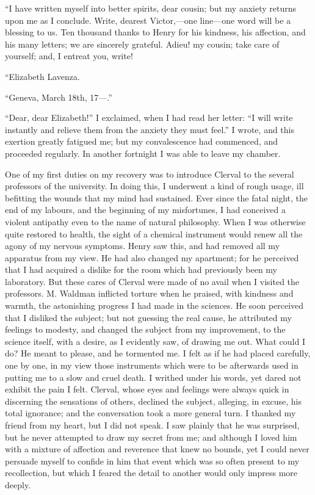 \documentclass[12pt,openright]{book}
\begin{document}
“I have written myself into better spirits, dear cousin; but my anxiety returns upon me as I conclude. Write, dearest Victor,—one line—one word will be a blessing to us. Ten thousand thanks to Henry for his kindness, his affection, and his many letters; we are sincerely grateful. Adieu! my cousin; take care of yourself; and, I entreat you, write!

“Elizabeth Lavenza.

“Geneva, March 18th, 17—.”

“Dear, dear Elizabeth!” I exclaimed, when I had read her letter: “I will write instantly and relieve them from the anxiety they must feel.” I wrote, and this exertion greatly fatigued me; but my convalescence had commenced, and proceeded regularly. In another fortnight I was able to leave my chamber.

One of my first duties on my recovery was to introduce Clerval to the several professors of the university. In doing this, I underwent a kind of rough usage, ill befitting the wounds that my mind had sustained. Ever since the fatal night, the end of my labours, and the beginning of my misfortunes, I had conceived a violent antipathy even to the name of natural philosophy. When I was otherwise quite restored to health, the sight of a chemical instrument would renew all the agony of my nervous symptoms. Henry saw this, and had removed all my apparatus from my view. He had also changed my apartment; for he perceived that I had acquired a dislike for the room which had previously been my laboratory. But these cares of Clerval were made of no avail when I visited the professors. M. Waldman inflicted torture when he praised, with kindness and warmth, the astonishing progress I had made in the sciences. He soon perceived that I disliked the subject; but not guessing the real cause, he attributed my feelings to modesty, and changed the subject from my improvement, to the science itself, with a desire, as I evidently saw, of drawing me out. What could I do? He meant to please, and he tormented me. I felt as if he had placed carefully, one by one, in my view those instruments which were to be afterwards used in putting me to a slow and cruel death. I writhed under his words, yet dared not exhibit the pain I felt. Clerval, whose eyes and feelings were always quick in discerning the sensations of others, declined the subject, alleging, in excuse, his total ignorance; and the conversation took a more general turn. I thanked my friend from my heart, but I did not speak. I saw plainly that he was surprised, but he never attempted to draw my secret from me; and although I loved him with a mixture of affection and reverence that knew no bounds, yet I could never persuade myself to confide in him that event which was so often present to my recollection, but which I feared the detail to another would only impress more deeply.
\end{document}
